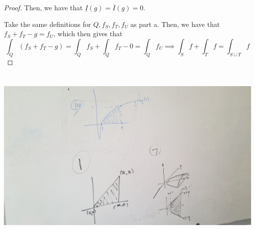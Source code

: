 \documentclass[12pt,letterpaper]{article}
\theoremstyle{definition}
\begin{document}
\begin{proof}
  Then, we have that $\underline{I}(g) = \overline{I}(g) = 0$.
  
  Take the same definitions for $Q, f_S, f_T, f_U$ as part a. Then, we have that
  $f_S + f_T - g = f_U$, which then gives that
  \[
    \int_Q(f_S + f_T - g) = \int_Qf_S +  \int_Qf_T - 0 = \int_Qf_U \implies \int_Sf + \int_Tf = \int_{S\cup T}f
  \]
\end{proof}

\begin{center}
  \includegraphics[height=3.5in]{./domains.jpg}
\end{center}
\end{document}
